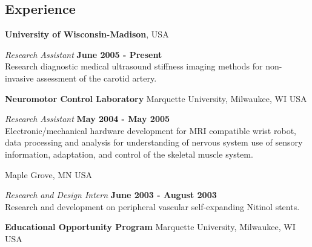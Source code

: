 \documentclass[margin,line]{res}
\begin{document}
\begin{resume}
% 
% 
% 
% 

\section{\sc Experience}

{\bf University of Wisconsin-Madison}, USA

\vspace{-.3cm}
{\em Research Assistant} \hfill {\bf June 2005 - Present} \\
Research diagnostic medical ultrasound stiffness imaging methods for non-invasive assessment of the carotid artery. 

{\bf Neuromotor Control Laboratory} Marquette University, Milwaukee, WI USA

\vspace{-.3cm}
{\em Research Assistant} \hfill {\bf May 2004 - May 2005} \\
Electronic/mechanical hardware development for MRI compatible wrist robot, data processing and analysis for understanding of nervous system use of sensory information,  adaptation,  and control of the skeletal muscle system.

 Maple Grove, MN USA

\vspace{-.3cm}
{\em Research and Design Intern} \hfill {\bf June 2003 - August 2003} \\
Research and development on peripheral vascular self-expanding Nitinol stents.

{\bf Educational Opportunity Program} Marquette University, Milwaukee, WI USA


\end{resume}
\end{document}
